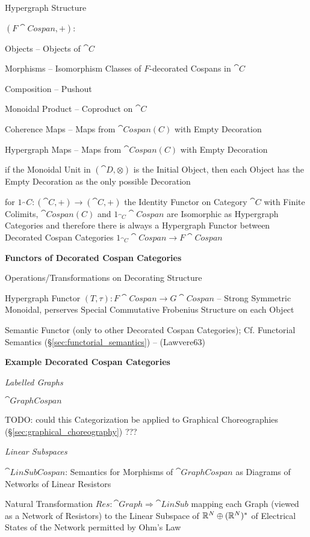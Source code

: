 Hypergraph Structure

$(F\cat{Cospan}, +)$:

Objects -- Objects of $\cat{C}$

Morphisms -- Isomorphism Classes of $F$-decorated Cospans in $\cat{C}$

Composition -- Pushout

Monoidal Product -- Coproduct on $\cat{C}$

Coherence Maps -- Maps from $\cat{Cospan(C)}$ with Empty Decoration

Hypergraph Maps -- Maps from $\cat{Cospan(C)}$ with Empty Decoration


if the Monoidal Unit in $(\cat{D}, \otimes)$ is the Initial Object,
then each Object has the Empty Decoration as the only possible
Decoration

for $1_\cat{C} : (\cat{C}, +) \rightarrow (\cat{C}, +)$ the Identity
Functor on Category $\cat{C}$ with Finite Colimits, $\cat{Cospan(C)}$
and $1_{\cat{C}}\cat{Cospan}$ are Isomorphic as Hypergraph Categories
and therefore there is always a Hypergraph Functor between Decorated
Cospan Categories $1_{\cat{C}}\cat{Cospan} \rightarrow F\cat{Cospan}$


\textbf{Functors of Decorated Cospan Categories}


Operations/Transformations on Decorating Structure

Hypergraph Functor $(T,\tau) : F\cat{Cospan} \rightarrow
G\cat{Cospan}$ -- Strong Symmetric Monoidal, perserves Special
Commutative Frobenius Structure on each Object

Semantic Functor (only to other Decorated Cospan Categories); \fist
Cf. Functorial Semantics (\S\ref{sec:functorial_semantics}) --
(Lawvere63)


\textbf{Example Decorated Cospan Categories}


\emph{Labelled Graphs}

$\cat{GraphCospan}$

TODO: could this Categorization be applied to Graphical Choreographies
(\S\ref{sec:graphical_choreography}) ???


\emph{Linear Subspaces}

$\cat{LinSubCospan}$: Semantics for Morphisms of $\cat{GraphCospan}$
as Diagrams of Networks of Linear Resistors

Natural Transformation $Res : \cat{Graph} \Rightarrow \cat{LinSub}$
mapping each Graph (viewed as a Network of Resistors) to the Linear
Subspace of $\mathbb{R}^N \oplus (\mathbb{R}^N)^*$ of Electrical States of the
Network permitted by Ohm's Law

